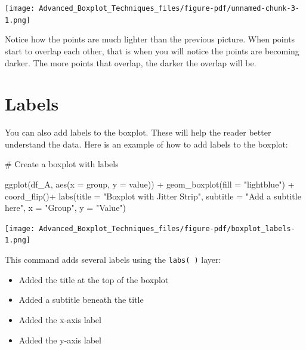 \documentclass[
  letterpaper,
  DIV=11,
  numbers=noendperiod]{scrreprt}
\newenvironment{Shaded}{\begin{snugshade}}{\end{snugshade}}
\newcommand{\AttributeTok}[1]{\textcolor[rgb]{0.40,0.45,0.13}{#1}}
\newcommand{\CommentTok}[1]{\textcolor[rgb]{0.37,0.37,0.37}{#1}}
\newcommand{\FunctionTok}[1]{\textcolor[rgb]{0.28,0.35,0.67}{#1}}
\newcommand{\NormalTok}[1]{\textcolor[rgb]{0.00,0.23,0.31}{#1}}
\newcommand{\SpecialCharTok}[1]{\textcolor[rgb]{0.37,0.37,0.37}{#1}}
\newcommand{\StringTok}[1]{\textcolor[rgb]{0.13,0.47,0.30}{#1}}
\providecommand{\tightlist}{%
  \setlength{\itemsep}{0pt}\setlength{\parskip}{0pt}}\usepackage{longtable,booktabs,array}
\begin{document}
\texttt{[image: Advanced\_Boxplot\_Techniques\_files/figure-pdf/unnamed-chunk-3-1.png]}

Notice how the points are much lighter than the previous picture. When
points start to overlap each other, that is when you will notice the
points are becoming darker. The more points that overlap, the darker the
overlap will be.

\section*{Labels}\label{labels}


You can also add labels to the boxplot. These will help the reader
better understand the data. Here is an example of how to add labels to
the boxplot:

\begin{Shaded}
\begin{Highlighting}[]
\CommentTok{\# Create a boxplot with labels}

\FunctionTok{ggplot}\NormalTok{(df\_A, }\FunctionTok{aes}\NormalTok{(}\AttributeTok{x =}\NormalTok{ group, }\AttributeTok{y =}\NormalTok{ value)) }\SpecialCharTok{+}
  \FunctionTok{geom\_boxplot}\NormalTok{(}\AttributeTok{fill =} \StringTok{"lightblue"}\NormalTok{) }\SpecialCharTok{+}
  \FunctionTok{coord\_flip}\NormalTok{()}\SpecialCharTok{+}
  \FunctionTok{labs}\NormalTok{(}\AttributeTok{title =} \StringTok{"Boxplot with Jitter Strip"}\NormalTok{,}
       \AttributeTok{subtitle =} \StringTok{"Add a subtitle here"}\NormalTok{,}
       \AttributeTok{x =} \StringTok{"Group"}\NormalTok{,}
       \AttributeTok{y =} \StringTok{"Value"}\NormalTok{)}
\end{Highlighting}
\end{Shaded}

\begin{center}
\texttt{[image: Advanced\_Boxplot\_Techniques\_files/figure-pdf/boxplot\_labels-1.png]}
\end{center}

This command adds several labels using the \texttt{labs(\ )} layer:

\begin{itemize}
\tightlist
\item
  Added the title at the top of the boxplot
\item
  Added a subtitle beneath the title
\item
  Added the x-axis label
\item
  Added the y-axis label
\end{itemize}
\end{document}
